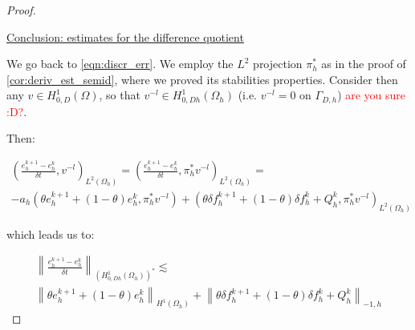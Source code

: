 \documentclass[english,a4paper,10pt,oneside]{scrbook}	%
\theoremstyle{break}
\newenvironment{mproof}[1][\proofname]{%
  \begin{proof}[#1]$ $\par\nobreak\ignorespaces
}{%
  \end{proof}
}
\renewcommand*{\proofname}{Proof}
\theoremstyle{remark}
\newcommand{\norm}[1]{\left\lVert#1\right\rVert}
\begin{document}
\begin{mproof}
%
%
%
%
%
%
%

\underline{Conclusion: estimates for the difference quotient}

We go back to \cref{eqn:discr_err}.  We employ the $L^2$ projection $\pi_h^*$ as in the proof of \cref{cor:deriv_est_semid}, where we proved its stabilities properties. Consider then any $v \in H^1_{0,D}(\Omega)$, so that $v^{-l} \in H^1_{0,Dh}(\Omega_h)$ (i.e. $v^{-l}=0$ on $\Gamma_{D,h}$) \textcolor{red}{are you sure :D?}.

Then:

\begin{align*}
\left ( \frac{e_{h}^{k+1}-e_h^k}{\delta t}, v^{-l}\right)_{L^2(\Omega_h)} = \left ( \frac{e_{h}^{k+1}-e_h^k}{\delta t}, \pi_h^* v^{-l}\right)_{L^2(\Omega_h)} =  \\- a_h(\theta e_h^{k+1}+(1-\theta)e^k_h, \pi_h^* v^{-l}) + (\theta \delta f_h^{k+1}+(1-\theta)\delta f_h^k + Q_h^k, \pi_h^* v^{-l})_{L^2(\Omega_h)}
\end{align*}

which leads us to:

\begin{align*}
\norm{ \frac{e_{h}^{k+1}-e_h^k}{\delta t}}_{(H^1_{0,Dh}(\Omega_h))^*} \lesssim  \\\norm{\theta e_h^{k+1}+(1-\theta)e^k_h}_{H^1(\Omega_h)} + \norm{\theta \delta f_h^{k+1}+(1-\theta)\delta f_h^k + Q_h^k}_{-1,h}
\end{align*}


\end{mproof}
\end{document}
